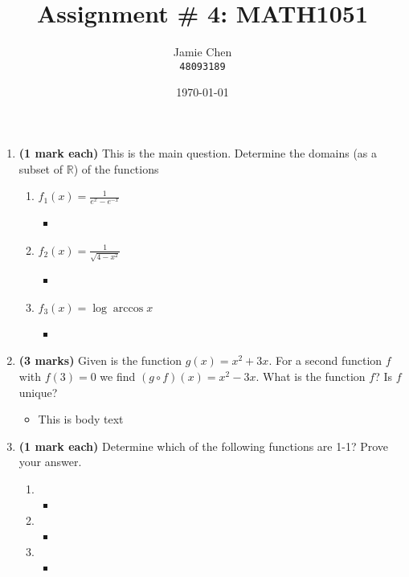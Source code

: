 \documentclass[12pt]{article}
\title{Assignment \# 4: MATH1051}
\author{Jamie Chen\\ \text{Student Number:} \texttt{48093189} \\ \text{Semester 2, 2023}}
\date{\today}
\begin{document}
\maketitle
\begin{enumerate}[leftmargin=\labelsep]

    \item {\bf (1 mark each)} This is the main question. Determine the domains (as a subset of $\mathbb{R}$) of the functions
        \begin{enumerate}
            \item $f_1(x)=\frac{1}{e^x-e^{-x}}$
                \begin{itemize}[label={}]
                    \item 
                \end{itemize}
            \item $f_2(x)=\frac{1}{\sqrt{4-x^2}}$
                \begin{itemize}[label={}]
                    \item 
                \end{itemize}
            \item $f_3(x)= \log \arccos x$ 
                \begin{itemize}[label={}]
                    \item 
                \end{itemize}
        \end{enumerate}
            
\newpage

    \item {\bf (3 marks)} Given is the function $g(x)=x^2+3x$. For a second function $f$ with $f(3)=0$ we find $(g \circ f)(x)=x^2-3x$. What is the function $f$? Is $f$ unique?
        \begin{itemize}[label={}]
            \item This is body text
        \end{itemize}

\newpage        
    
    \item {\bf (1 mark each)} Determine which of the following functions are 1-1? Prove your answer.
        \begin{enumerate}
            \item
                \begin{itemize}[label={}]
                    \item 
                \end{itemize}
            \item 
                \begin{itemize}[label={}]
                    \item 
                \end{itemize}
            \item 
                \begin{itemize}[label={}]
                    \item 
                \end{itemize}
        \end{enumerate}
            

\end{enumerate}
\end{document}
